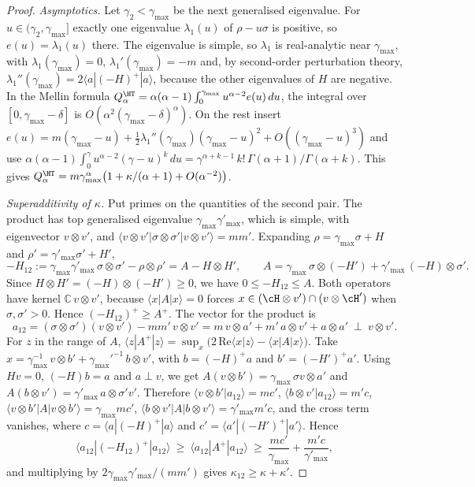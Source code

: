 \begin{proof}
\emph{Asymptotics.} Let $\gamma_2<\gamma_{\max}$ be the next generalised eigenvalue. For $u\in(\gamma_2,\gamma_{\max}]$ exactly one eigenvalue $\lambda_1(u)$ of $\rho-u\sigma$ is positive, so $e(u)=\lambda_1(u)$ there. The eigenvalue is simple, so $\lambda_1$ is real-analytic near $\gamma_{\max}$, with $\lambda_1(\gamma_{\max})=0$, $\lambda_1'(\gamma_{\max})=-m$ and, by second-order perturbation theory, $\lambda_1''(\gamma_{\max})=2\langle a|(-H)^+|a\rangle$, because the other eigenvalues of $H$ are negative. In the Mellin formula $Q^\HT_\alpha=\alpha(\alpha-1)\int_0^{\gamma_{\max}}u^{\alpha-2}e(u)\,du$, the integral over $[0,\gamma_{\max}-\delta]$ is $O(\alpha^2(\gamma_{\max}-\delta)^\alpha)$. On the rest insert $e(u)=m(\gamma_{\max}-u)+\frac12\lambda_1''(\gamma_{\max})(\gamma_{\max}-u)^2+O((\gamma_{\max}-u)^3)$ and use $\alpha(\alpha-1)\int_0^{\gamma}u^{\alpha-2}(\gamma-u)^k\,du=\gamma^{\alpha+k-1}\,k!\,\Gamma(\alpha+1)/\Gamma(\alpha+k)$. This gives $Q^\HT_\alpha=m\gamma_{\max}^\alpha\big(1+\kappa/(\alpha+1)+O(\alpha^{-2})\big)$.

\emph{Superadditivity of $\kappa$.} Put primes on the quantities of the second pair. The product has top generalised eigenvalue $\gamma_{\max}\gamma'_{\max}$, which is simple, with eigenvector $v\otimes v'$, and $\langle v\otimes v'|\sigma\otimes\sigma'|v\otimes v'\rangle=mm'$. Expanding $\rho=\gamma_{\max}\sigma+H$ and $\rho'=\gamma'_{\max}\sigma'+H'$,
\[
-H_{12}:=\gamma_{\max}\gamma'_{\max}\,\sigma\otimes\sigma'-\rho\otimes\rho'=A-H\otimes H',\qquad A=\gamma_{\max}\,\sigma\otimes(-H')+\gamma'_{\max}\,(-H)\otimes\sigma' .
\]
Since $H\otimes H'=(-H)\otimes(-H')\ge0$, we have $0\le-H_{12}\le A$. Both operators have kernel $\mathbb C\,v\otimes v'$, because $\langle x|A|x\rangle=0$ forces $x\in(\cH\otimes v')\cap(v\otimes\cH')$ when $\sigma,\sigma'>0$. Hence $(-H_{12})^+\ge A^+$. The vector for the product is
\[
a_{12}=(\sigma\otimes\sigma')(v\otimes v')-mm'\,v\otimes v'=m\,v\otimes a'+m'\,a\otimes v'+a\otimes a'\ \perp\ v\otimes v'.
\]
For $z$ in the range of $A$, $\langle z|A^+|z\rangle=\sup_x\big(2\,\mathrm{Re}\langle x|z\rangle-\langle x|A|x\rangle\big)$. Take $x=\gamma_{\max}^{-1}\,v\otimes b'+\gamma_{\max}'^{-1}\,b\otimes v'$, with $b=(-H)^+a$ and $b'=(-H')^+a'$. Using $Hv=0$, $(-H)b=a$ and $a\perp v$, we get $A(v\otimes b')=\gamma_{\max}\,\sigma v\otimes a'$ and $A(b\otimes v')=\gamma'_{\max}\,a\otimes\sigma'v'$. Therefore $\langle v\otimes b'|a_{12}\rangle=mc'$, $\langle b\otimes v'|a_{12}\rangle=m'c$, $\langle v\otimes b'|A|v\otimes b'\rangle=\gamma_{\max}mc'$, $\langle b\otimes v'|A|b\otimes v'\rangle=\gamma'_{\max}m'c$, and the cross term vanishes, where $c=\langle a|(-H)^+|a\rangle$ and $c'=\langle a'|(-H')^+|a'\rangle$. Hence
\[
\langle a_{12}|(-H_{12})^+|a_{12}\rangle\ \ge\ \langle a_{12}|A^+|a_{12}\rangle\ \ge\ \frac{mc'}{\gamma_{\max}}+\frac{m'c}{\gamma'_{\max}},
\]
and multiplying by $2\gamma_{\max}\gamma'_{\max}/(mm')$ gives $\kappa_{12}\ge\kappa+\kappa'$.
\end{proof}

